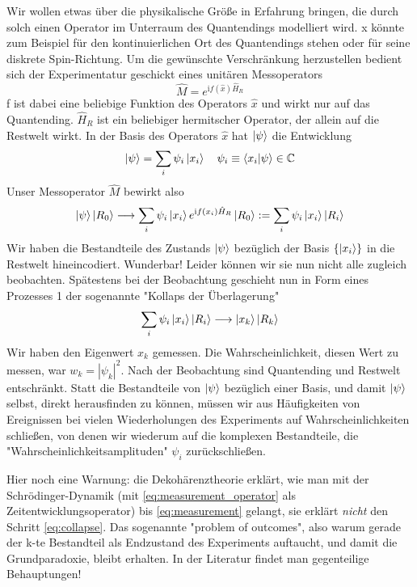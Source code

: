 \documentclass[12pt]{book}
\begin{document}
Wir wollen etwas über die physikalische Größe in Erfahrung bringen, die durch solch einen Operator im Unterraum des Quantendings modelliert wird. x könnte zum Beispiel für den kontinuierlichen Ort des Quantendings stehen oder für seine diskrete Spin-Richtung. Um die gewünschte Verschränkung herzustellen bedient sich der Experimentatur geschickt eines unitären Messoperators
\begin{equation} \label{eq:measurement_operator}
\hat{M} = e^{ \mathrm{i} f(\hat{x}) \hat{H}_R }
\end{equation} 
f ist dabei eine beliebige Funktion des Operators $\hat{x}$ und wirkt nur auf das Quantending. $\hat{H}_R$ ist ein beliebiger hermitscher Operator, der allein auf die Restwelt wirkt. In der Basis des Operators $\hat{x}$ hat $\ket{\psi}$ die Entwicklung
\begin{equation} 
\ket{\psi} = \sum_i \psi_i \ket{x_i} \quad \psi_i \equiv \bra{x_i}\ket{\psi} \in \mathbb{C}
\end{equation} 
Unser Messoperator $\hat{M}$ bewirkt also
\begin{equation} \label{eq:measurement}
\ket{\psi} \ket{R_0} \longrightarrow \sum_i \psi_i \ket{x_i} e^{ \mathrm{i} f(x_i) \hat{H}_R } \ket{R_0} := \sum_i \psi_i \ket{x_i} \ket{R_i}
\end{equation} 
Wir haben die Bestandteile des Zustands $\ket{\psi}$ bezüglich der Basis $\{\ket{x_i}\}$
in die Restwelt hineincodiert. Wunderbar! Leider können wir sie nun nicht alle zugleich beobachten. Spätestens bei der Beobachtung geschieht nun in Form eines Prozesses 1 der sogenannte "Kollaps der Überlagerung"
\begin{equation} \label{eq:collapse}
\sum_i \psi_i \ket{x_i} \ket{R_i} \longrightarrow \ket{x_k} \ket{R_k}
\end{equation} 
Wir haben den Eigenwert $x_k$ gemessen. Die Wahrscheinlichkeit, diesen Wert zu messen, war $w_k = |\psi_k|^2$. Nach der Beobachtung sind Quantending und Restwelt entschränkt. Statt die Bestandteile von $\ket{\psi}$ bezüglich einer Basis, und damit $\ket{\psi}$ selbst, direkt herausfinden zu können, müssen wir aus Häufigkeiten von Ereignissen bei vielen Wiederholungen des Experiments auf Wahrscheinlichkeiten schließen, von denen wir wiederum auf die komplexen Bestandteile, die "Wahrscheinlichkeitsamplituden" $\psi_i$ zurückschließen.

Hier noch eine Warnung: die Dekohärenztheorie erklärt, wie man mit der Schrödinger-Dynamik (mit \ref{eq:measurement_operator} als Zeitentwicklungsoperator) bis \ref{eq:measurement} gelangt, sie erklärt \emph{nicht} den Schritt \ref{eq:collapse}. Das sogenannte "problem of outcomes", also warum gerade der k-te Bestandteil als Endzustand des Experiments auftaucht, und damit die Grundparadoxie, bleibt erhalten. In der Literatur findet man gegenteilige Behauptungen!
\end{document}
